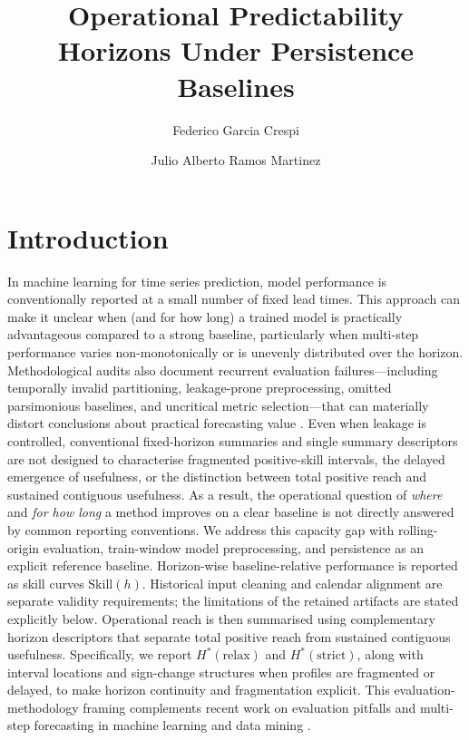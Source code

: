 \documentclass[pdflatex,sn-mathphys]{sn-jnl}
\title[Operational predictability horizons]{Operational Predictability Horizons Under Persistence Baselines}
\author*[1]{Federico Garcia Crespi}
\author[2]{Julio Alberto Ramos Martinez}
\affil[1]{Departamento de Ingenier\'ia de Computadores, Universidad Miguel Hern\'andez, Elche, Spain}
\affil[2]{Unidad de Docencia Online de la UMH, Universidad Miguel Hern\'andez, Elche, Spain (T\'ecnico de Innovaci\'on Docente)}
\begin{document}
\maketitle

\section{Introduction}
In machine learning for time series prediction, model performance is conventionally reported at a small number of fixed lead times. This approach can make it unclear when (and for how long) a trained model is practically advantageous compared to a strong baseline, particularly when multi-step performance varies non-monotonically or is unevenly distributed over the horizon. Methodological audits also document recurrent evaluation failures—including temporally invalid partitioning, leakage-prone preprocessing, omitted parsimonious baselines, and uncritical metric selection—that can materially distort conclusions about practical forecasting value \citep{hewamalage2023dmkd}. Even when leakage is controlled, conventional fixed-horizon summaries and single summary descriptors are not designed to characterise fragmented positive-skill intervals, the delayed emergence of usefulness, or the distinction between total positive reach and sustained contiguous usefulness. As a result, the operational question of \emph{where} and \emph{for how long} a method improves on a clear baseline is not directly answered by common reporting conventions.
We address this capacity gap with rolling-origin evaluation, train-window model preprocessing, and persistence as an explicit reference baseline. Horizon-wise baseline-relative performance is reported as skill curves $\mathrm{Skill}(h)$. Historical input cleaning and calendar alignment are separate validity requirements; the limitations of the retained artifacts are stated explicitly below.
Operational reach is then summarised using complementary horizon descriptors that separate total positive reach from sustained contiguous usefulness. Specifically, we report $H^*(\mathrm{relax})$ and $H^*(\mathrm{strict})$, along with interval locations and sign-change structures when profiles are fragmented or delayed, to make horizon continuity and fragmentation explicit.
This evaluation-methodology framing complements recent work on evaluation pitfalls and multi-step forecasting in machine learning and data mining \citep{hewamalage2023dmkd,green2025stratify,kreuzer2025trend,cerqueira2020,modelradar2025}.
\end{document}
